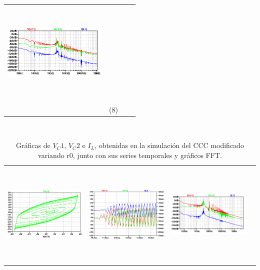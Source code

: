 \documentclass{rbf}
\begin{document}
\begin{table}[h]
\begin{tabular}{c c c c}
        \includegraphics[width=5cm,height=5cm]{r0/ro50.FFT.png}&\\
        & (8) &  \\
        \hline
    \end{tabular}
\end{table}

\begin{table}[h]
    \centering
        \caption{\label{tab:CCC modificado variando r0}  Gráficas de $V_C1$, $V_C2$ e $I_L$, obtenidas en la simulación del CCC modificado variando r0, junto con sus series temporales y gráficos FFT.}\\
        \begin{tabular}{c c c c}
        \hline    
        \includegraphics[width=5cm,height=5cm]{r0/ro1_cap.png}&
        \includegraphics[width=5cm,height=5cm]{r0/ro1TS_cap.png}&
        \includegraphics[width=5cm,height=5cm]{r0/ro1.FFT_cap.png}&\\

\end{tabular}
\end{table}
\end{document}
